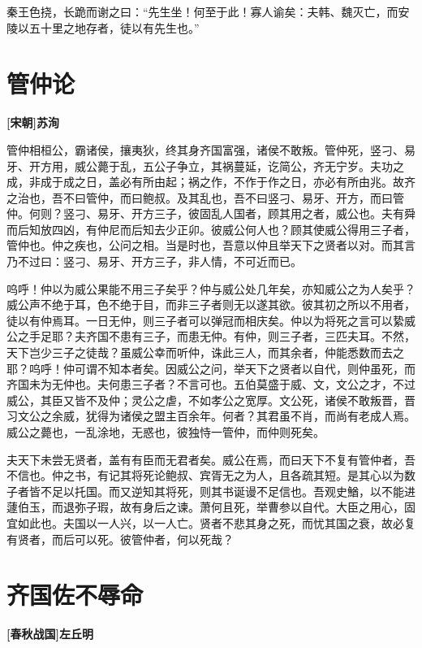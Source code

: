 \documentclass[UTF8,titlepage,oneside]{ctexbook}
\begin{document}
秦王色挠，长跪而谢之曰：“先生坐！何至于此！寡人谕矣：夫韩、魏灭亡，而安陵以五十里之地存者，徒以有先生也。”



\chapter*{管仲论}
\begin{center}
	\textbf{[宋朝]苏洵}
\end{center}


管仲相桓公，霸诸侯，攘夷狄，终其身齐国富强，诸侯不敢叛。管仲死，竖刁、易牙、开方用，威公薨于乱，五公子争立，其祸蔓延，讫简公，齐无宁岁。夫功之成，非成于成之日，盖必有所由起；祸之作，不作于作之日，亦必有所由兆。故齐之治也，吾不曰管仲，而曰鲍叔。及其乱也，吾不曰竖刁、易牙、开方，而曰管仲。何则？竖刁、易牙、开方三子，彼固乱人国者，顾其用之者，威公也。夫有舜而后知放四凶，有仲尼而后知去少正卯。彼威公何人也？顾其使威公得用三子者，管仲也。仲之疾也，公问之相。当是时也，吾意以仲且举天下之贤者以对。而其言乃不过曰：竖刁、易牙、开方三子，非人情，不可近而已。


呜呼！仲以为威公果能不用三子矣乎？仲与威公处几年矣，亦知威公之为人矣乎？威公声不绝于耳，色不绝于目，而非三子者则无以遂其欲。彼其初之所以不用者，徒以有仲焉耳。一日无仲，则三子者可以弹冠而相庆矣。仲以为将死之言可以絷威公之手足耶？夫齐国不患有三子，而患无仲。有仲，则三子者，三匹夫耳。不然，天下岂少三子之徒哉？虽威公幸而听仲，诛此三人，而其余者，仲能悉数而去之耶？呜呼！仲可谓不知本者矣。因威公之问，举天下之贤者以自代，则仲虽死，而齐国未为无仲也。夫何患三子者？不言可也。五伯莫盛于威、文，文公之才，不过威公，其臣又皆不及仲；灵公之虐，不如孝公之宽厚。文公死，诸侯不敢叛晋，晋习文公之余威，犹得为诸侯之盟主百余年。何者？其君虽不肖，而尚有老成人焉。威公之薨也，一乱涂地，无惑也，彼独恃一管仲，而仲则死矣。


夫天下未尝无贤者，盖有有臣而无君者矣。威公在焉，而曰天下不复有管仲者，吾不信也。仲之书，有记其将死论鲍叔、宾胥无之为人，且各疏其短。是其心以为数子者皆不足以托国。而又逆知其将死，则其书诞谩不足信也。吾观史鰌，以不能进蘧伯玉，而退弥子瑕，故有身后之谏。萧何且死，举曹参以自代。大臣之用心，固宜如此也。夫国以一人兴，以一人亡。贤者不悲其身之死，而忧其国之衰，故必复有贤者，而后可以死。彼管仲者，何以死哉？



\chapter*{齐国佐不辱命}
\begin{center}
	\textbf{[春秋战国]左丘明}
\end{center}
\end{document}
